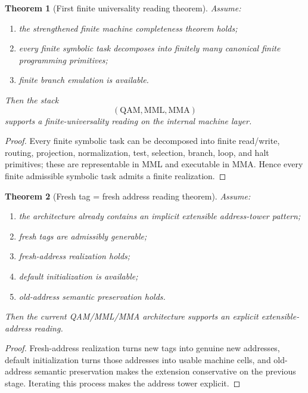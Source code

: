 \documentclass[12pt,a4paper]{article}
\newtheorem{theorem}{Theorem}[section]
\begin{document}
\begin{theorem}[First finite universality reading theorem]\label{thm:first-finite-universality-computational-layer}
Assume:
\begin{enumerate}[leftmargin=2em]
 \item the strengthened finite machine completeness theorem holds;
 \item every finite symbolic task decomposes into finitely many canonical finite programming primitives;
 \item finite branch emulation is available.
\end{enumerate}
Then the stack
\[
(\mathrm{QAM},\mathrm{MML},\mathrm{MMA})
\]
supports a finite-universality reading on the internal machine layer.
\end{theorem}

\begin{proof}
Every finite symbolic task can be decomposed into finite read/write, routing, projection, normalization, test, selection, branch, loop, and halt primitives; these are representable in MML and executable in MMA. Hence every finite admissible symbolic task admits a finite realization.
\end{proof}

\begin{theorem}[Fresh tag = fresh address reading theorem]\label{thm:fresh-tag-equals-fresh-address-computational-layer}
Assume:
\begin{enumerate}[leftmargin=2em]
 \item the architecture already contains an implicit extensible address-tower pattern;
 \item fresh tags are admissibly generable;
 \item fresh-address realization holds;
 \item default initialization is available;
 \item old-address semantic preservation holds.
\end{enumerate}
Then the current QAM/MML/MMA architecture supports an explicit extensible-address reading.
\end{theorem}

\begin{proof}
Fresh-address realization turns new tags into genuine new addresses, default initialization turns those addresses into usable machine cells, and old-address semantic preservation makes the extension conservative on the previous stage. Iterating this process makes the address tower explicit.
\end{proof}
\end{document}
